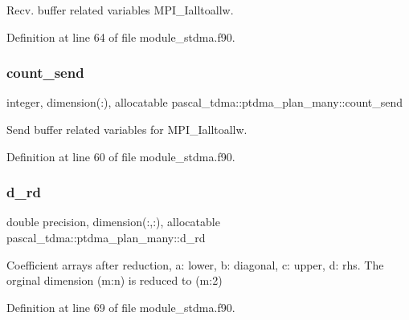 Recv. buffer related variables M\+P\+I\+\_\+\+Ialltoallw. 



Definition at line 64 of file module\+\_\+stdma.\+f90.

\mbox{\label{structpascal__tdma_1_1ptdma__plan__many_ab7a5a4be85650cfe4dfc30fd83b132d7}} 
\subsubsection{\texorpdfstring{count\_send}{count\_send}}
{\footnotesize\ttfamily integer, dimension(\+:), allocatable pascal\+\_\+tdma\+::ptdma\+\_\+plan\+\_\+many\+::count\+\_\+send}



Send buffer related variables for M\+P\+I\+\_\+\+Ialltoallw. 



Definition at line 60 of file module\+\_\+stdma.\+f90.

\mbox{\label{structpascal__tdma_1_1ptdma__plan__many_aa1054814f874504a77ad17a838a80fd2}} 
\subsubsection{\texorpdfstring{d\_rd}{d\_rd}}
{\footnotesize\ttfamily double precision, dimension(\+:,\+:), allocatable pascal\+\_\+tdma\+::ptdma\+\_\+plan\+\_\+many\+::d\+\_\+rd}



Coefficient arrays after reduction, a\+: lower, b\+: diagonal, c\+: upper, d\+: rhs. The orginal dimension (m\+:n) is reduced to (m\+:2) 



Definition at line 69 of file module\+\_\+stdma.\+f90.

\mbox{\label{structpascal__tdma_1_1ptdma__plan__many_af0941ce4b9206c36a3a059d2bae84d2b}} 
